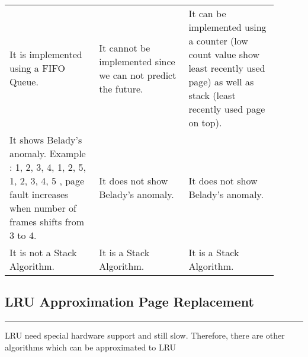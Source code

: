 \documentclass[12pt,onecolumn]{IEEEtran}
\begin{document}
\begin{table}[H]
\begin{tabular}{|p{0.3\linewidth} | p{0.3\linewidth}|p{0.3\linewidth} |}
		\vspace{1mm}\\
		\hline
		\vspace{1mm}
		It is implemented using a FIFO Queue.

		\vspace{1mm}
		& 
		\vspace{1mm}
		It cannot be implemented since we can not predict the future.
		
		\vspace{1mm}
		&
		\vspace{1mm}
		It can be implemented using a counter (low count value show least recently used page) as well as stack (least recently used page on top).
		
		\vspace{1mm}\\
		\hline
		\vspace{1mm}
		It shows Belady's anomaly. Example : 1, 2, 3, 4, 1, 2, 5, 1, 2, 3, 4, 5 , page fault increases when number of frames shifts from 3 to 4. 
		
		\vspace{1mm}
		& 
		\vspace{1mm}
		It does not show Belady's anomaly.
		
		\vspace{1mm}
		&
		\vspace{1mm}
		It does not show Belady's anomaly.
		
		\vspace{1mm}\\
		\hline
		\vspace{1mm}
		It is not a Stack Algorithm.

		\vspace{1mm}
		& 
		\vspace{1mm}
		It is a Stack Algorithm.

		\vspace{1mm}
		&
		\vspace{1mm}
		It is a Stack Algorithm.
		
		\vspace{1mm}\\
		\hline
		
	\end{tabular}
\end{table}







\subsection{LRU Approximation Page Replacement}
\hrule
\vspace{3mm}
LRU need special hardware support and still slow. Therefore, there are other algorithms which can be approximated to LRU
\vspace{3mm}
\end{document}
